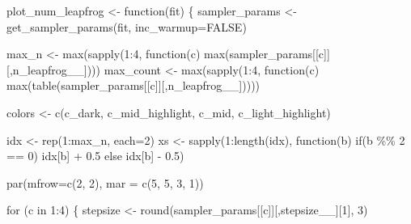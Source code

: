 \documentclass[
  letterpaper,
  DIV=11,
  numbers=noendperiod]{scrartcl}
\newenvironment{Shaded}{\begin{snugshade}}{\end{snugshade}}
\newcommand{\AttributeTok}[1]{\textcolor[rgb]{0.40,0.45,0.13}{#1}}
\newcommand{\ConstantTok}[1]{\textcolor[rgb]{0.56,0.35,0.01}{#1}}
\newcommand{\ControlFlowTok}[1]{\textcolor[rgb]{0.00,0.23,0.31}{#1}}
\newcommand{\DecValTok}[1]{\textcolor[rgb]{0.68,0.00,0.00}{#1}}
\newcommand{\FloatTok}[1]{\textcolor[rgb]{0.68,0.00,0.00}{#1}}
\newcommand{\FunctionTok}[1]{\textcolor[rgb]{0.28,0.35,0.67}{#1}}
\newcommand{\NormalTok}[1]{\textcolor[rgb]{0.00,0.23,0.31}{#1}}
\newcommand{\OtherTok}[1]{\textcolor[rgb]{0.00,0.23,0.31}{#1}}
\newcommand{\SpecialCharTok}[1]{\textcolor[rgb]{0.37,0.37,0.37}{#1}}
\newcommand{\StringTok}[1]{\textcolor[rgb]{0.13,0.47,0.30}{#1}}
\begin{document}
\begin{Shaded}
\begin{Highlighting}[]
\NormalTok{plot\_num\_leapfrog }\OtherTok{\textless{}{-}} \ControlFlowTok{function}\NormalTok{(fit) \{}
\NormalTok{  sampler\_params }\OtherTok{\textless{}{-}} \FunctionTok{get\_sampler\_params}\NormalTok{(fit, }\AttributeTok{inc\_warmup=}\ConstantTok{FALSE}\NormalTok{)}

\NormalTok{  max\_n }\OtherTok{\textless{}{-}} \FunctionTok{max}\NormalTok{(}\FunctionTok{sapply}\NormalTok{(}\DecValTok{1}\SpecialCharTok{:}\DecValTok{4}\NormalTok{, }\ControlFlowTok{function}\NormalTok{(c) }\FunctionTok{max}\NormalTok{(sampler\_params[[c]][,}\StringTok{\textquotesingle{}n\_leapfrog\_\_\textquotesingle{}}\NormalTok{])))}
\NormalTok{  max\_count }\OtherTok{\textless{}{-}} \FunctionTok{max}\NormalTok{(}\FunctionTok{sapply}\NormalTok{(}\DecValTok{1}\SpecialCharTok{:}\DecValTok{4}\NormalTok{, }\ControlFlowTok{function}\NormalTok{(c) }\FunctionTok{max}\NormalTok{(}\FunctionTok{table}\NormalTok{(sampler\_params[[c]][,}\StringTok{\textquotesingle{}n\_leapfrog\_\_\textquotesingle{}}\NormalTok{]))))}

\NormalTok{  colors }\OtherTok{\textless{}{-}} \FunctionTok{c}\NormalTok{(c\_dark, c\_mid\_highlight, c\_mid, c\_light\_highlight)}

\NormalTok{  idx }\OtherTok{\textless{}{-}} \FunctionTok{rep}\NormalTok{(}\DecValTok{1}\SpecialCharTok{:}\NormalTok{max\_n, }\AttributeTok{each=}\DecValTok{2}\NormalTok{)}
\NormalTok{  xs }\OtherTok{\textless{}{-}} \FunctionTok{sapply}\NormalTok{(}\DecValTok{1}\SpecialCharTok{:}\FunctionTok{length}\NormalTok{(idx), }\ControlFlowTok{function}\NormalTok{(b) }\ControlFlowTok{if}\NormalTok{(b }\SpecialCharTok{\%\%} \DecValTok{2} \SpecialCharTok{==} \DecValTok{0}\NormalTok{) idx[b] }\SpecialCharTok{+} \FloatTok{0.5}
                                          \ControlFlowTok{else}\NormalTok{ idx[b] }\SpecialCharTok{{-}} \FloatTok{0.5}\NormalTok{)}

  \FunctionTok{par}\NormalTok{(}\AttributeTok{mfrow=}\FunctionTok{c}\NormalTok{(}\DecValTok{2}\NormalTok{, }\DecValTok{2}\NormalTok{), }\AttributeTok{mar =} \FunctionTok{c}\NormalTok{(}\DecValTok{5}\NormalTok{, }\DecValTok{5}\NormalTok{, }\DecValTok{3}\NormalTok{, }\DecValTok{1}\NormalTok{))}

  \ControlFlowTok{for}\NormalTok{ (c }\ControlFlowTok{in} \DecValTok{1}\SpecialCharTok{:}\DecValTok{4}\NormalTok{) \{}
\NormalTok{    stepsize }\OtherTok{\textless{}{-}} \FunctionTok{round}\NormalTok{(sampler\_params[[c]][,}\StringTok{\textquotesingle{}stepsize\_\_\textquotesingle{}}\NormalTok{][}\DecValTok{1}\NormalTok{], }\DecValTok{3}\NormalTok{)}
  

\end{Highlighting}
\end{Shaded}
\end{document}
